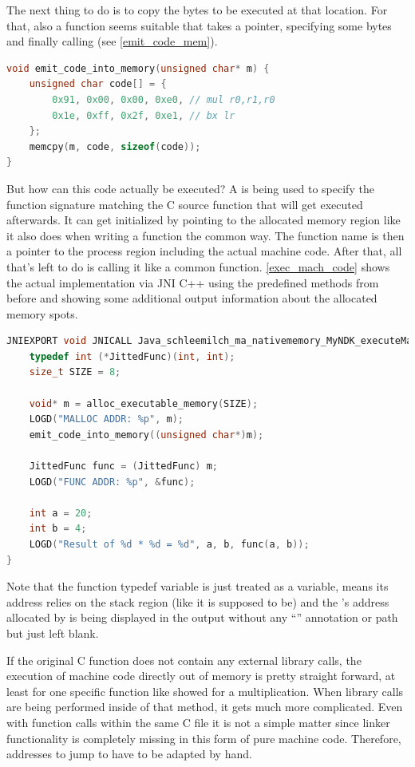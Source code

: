 The next thing to do is to copy the bytes to be executed at that location. For that,
also a function seems suitable that takes a pointer, specifying some bytes and finally calling  (see \autoref{emit_code_mem}).
\begin{lstlisting}[language=C++, caption=emit\_code\_into\_memory(), label=emit_code_mem]
void emit_code_into_memory(unsigned char* m) {
    unsigned char code[] = {
        0x91, 0x00, 0x00, 0xe0, // mul r0,r1,r0
        0x1e, 0xff, 0x2f, 0xe1, // bx lr
    };
    memcpy(m, code, sizeof(code));
}
\end{lstlisting}
But how can this code actually be executed?
A  is being used to specify the function signature matching the C source function that will get executed afterwards.
It can get initialized by pointing to the allocated memory region like it also does when
writing a function the common way. The function name is then a pointer to the process region including the actual machine code.
After that, all that's left to do is calling it like a common function.
\autoref{exec_mach_code} shows the actual implementation via JNI C++ using the predefined methods from before and showing some additional output information about
the allocated memory spots.
\begin{lstlisting}[language=C++, caption=executeMachineCode(), label=exec_mach_code]
JNIEXPORT void JNICALL Java_schleemilch_ma_nativememory_MyNDK_executeMachineCode (JNIEnv *env, jobject obj){
    typedef int (*JittedFunc)(int, int);
    size_t SIZE = 8;

    void* m = alloc_executable_memory(SIZE);
    LOGD("MALLOC ADDR: %p", m);
    emit_code_into_memory((unsigned char*)m);

    JittedFunc func = (JittedFunc) m;
    LOGD("FUNC ADDR: %p", &func);

    int a = 20;
    int b = 4;
    LOGD("Result of %d * %d = %d", a, b, func(a, b));
}
\end{lstlisting}
Note that the function typedef variable  is just treated as a variable,
means its address relies on the stack region (like it is supposed to be)
and the 's address allocated by  is being displayed in the  output without any ``'' annotation or path but just left blank.

If the original C function does not contain any external library calls, the execution
of machine code directly out of memory is pretty straight forward, at least for one
specific function like showed for a multiplication. When library calls are being
performed inside of that method, it gets much more complicated. Even with function calls
within the same C file it is not a simple matter since linker functionality is
completely missing in this form of pure machine code. Therefore, addresses to jump to
have to be adapted by hand.

